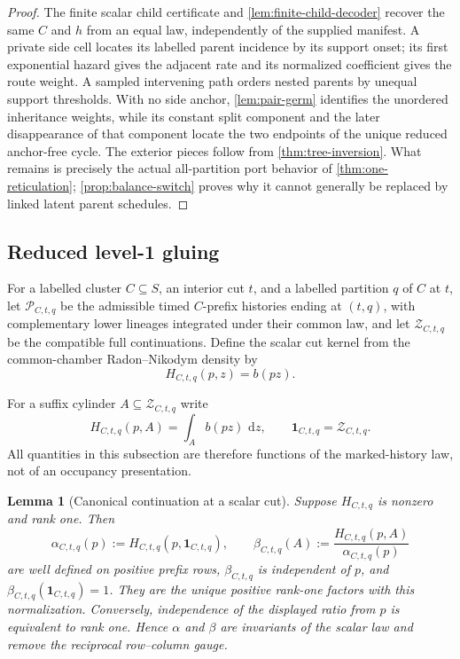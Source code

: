 \documentclass[11pt]{article}
\newtheorem{lemma}[theorem]{Lemma}
\newcommand{\one}{\mathbf 1}
\newcommand{\dd}{\,\mathrm d}
\begin{document}
\begin{proof}
The finite scalar child certificate and \cref{lem:finite-child-decoder} recover the same $C$ and $h$ from an equal law, independently of the supplied manifest.  A private side cell locates its labelled parent incidence by its support onset; its first exponential hazard gives the adjacent rate and its normalized coefficient gives the route weight.  A sampled intervening path orders nested parents by unequal support thresholds.  With no side anchor, \cref{lem:pair-germ} identifies the unordered inheritance weights, while its constant split component and the later disappearance of that component locate the two endpoints of the unique reduced anchor-free cycle.  The exterior pieces follow from \cref{thm:tree-inversion}.  What remains is precisely the actual all-partition port behavior of \cref{thm:one-reticulation}; \cref{prop:balance-switch} proves why it cannot generally be replaced by linked latent parent schedules.
\end{proof}

\subsection{Reduced level-1 gluing}

For a labelled cluster $C\subseteq S$, an interior cut $t$, and a labelled partition $q$ of $C$ at $t$, let $\mathcal P_{C,t,q}$ be the admissible timed $C$-prefix histories ending at $(t,q)$, with complementary lower lineages integrated under their common law, and let $\mathcal Z_{C,t,q}$ be the compatible full continuations.  Define the scalar cut kernel from the common-chamber Radon--Nikodym density by
\[
H_{C,t,q}(p,z)=b(pz).
\]

For a suffix cylinder $A\subseteq\mathcal Z_{C,t,q}$ write
\[
H_{C,t,q}(p,A)=\int_A b(pz)\,\dd z,
\qquad
\one_{C,t,q}=\mathcal Z_{C,t,q}.
\]
All quantities in this subsection are therefore functions of the marked-history law, not of an occupancy presentation.

\begin{lemma}[Canonical continuation at a scalar cut]
\label{lem:canonical-continuation}
Suppose $H_{C,t,q}$ is nonzero and rank one.  Then
\[
\alpha_{C,t,q}(p):=H_{C,t,q}(p,\one_{C,t,q}),
\qquad
\beta_{C,t,q}(A):=
\frac{H_{C,t,q}(p,A)}{\alpha_{C,t,q}(p)}
\]
are well defined on positive prefix rows, $\beta_{C,t,q}$ is independent of $p$, and $\beta_{C,t,q}(\one_{C,t,q})=1$.  They are the unique positive rank-one factors with this normalization.  Conversely, independence of the displayed ratio from $p$ is equivalent to rank one.  Hence $\alpha$ and $\beta$ are invariants of the scalar law and remove the reciprocal row--column gauge.
\end{lemma}
\end{document}
